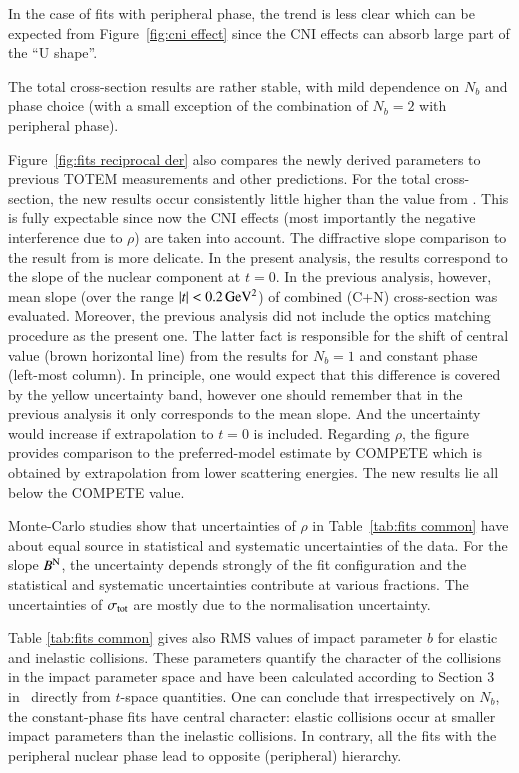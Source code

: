 In the case of fits with peripheral phase, the trend is less clear which can be expected from Figure~\ref{fig:cni effect} since the CNI effects can absorb large part of the ``U shape''.

The total cross-section results are rather stable, with mild dependence on $N_b$ and phase choice (with a small exception of the combination of $N_b = 2$ with peripheral phase).

Figure~\ref{fig:fits reciprocal der} also compares the newly derived parameters to previous TOTEM measurements and other predictions. For the total cross-section, the new results occur consistently little higher than the value from \cite{prl111}. This is fully expectable since now the CNI effects (most importantly the negative interference due to $\rho$) are taken into account. The diffractive slope comparison to the result from \cite{prl111} is more delicate. In the present analysis, the results correspond to the slope of the nuclear component at $t = 0$. In the previous analysis, however, mean slope (over the range $|t| < 0.2\,{\rm GeV^2}$) of combined (C+N) cross-section was evaluated. Moreover, the previous analysis did not include the optics matching procedure as the present one. The latter fact is responsible for the shift of central value (brown horizontal line) from the results for $N_b = 1$ and constant phase (left-most column). In principle, one would expect that this difference is covered by the yellow uncertainty band, however one should remember that in the previous analysis it only corresponds to the mean slope. And the uncertainty would increase if extrapolation to $t = 0$ is included.
%
Regarding $\rho$, the figure provides comparison to the preferred-model estimate by COMPETE \cite{compete} which is obtained by extrapolation from lower scattering energies. The new results lie all below the COMPETE value.

Monte-Carlo studies show that uncertainties of $\rho$ in Table~\ref{tab:fits common} have about equal source in statistical and systematic uncertainties of the data. For the slope $B^{\rm N}$, the uncertainty depends strongly of the fit configuration and the statistical and systematic uncertainties contribute at various fractions. The uncertainties of $\sigma_{\rm tot}$ are mostly due to the normalisation uncertainty.

Table \ref{tab:fits common} gives also RMS values of impact parameter $b$ for elastic and inelastic collisions. These parameters quantify the character of the collisions in the impact parameter space and have been calculated according to Section 3 in~\cite{klk02} directly from $t$-space quantities. 
One can conclude that irrespectively on $N_b$, the constant-phase fits have central character: elastic collisions occur at smaller impact parameters than the inelastic collisions. In contrary, all the fits with the peripheral nuclear phase lead to opposite (peripheral) hierarchy.


